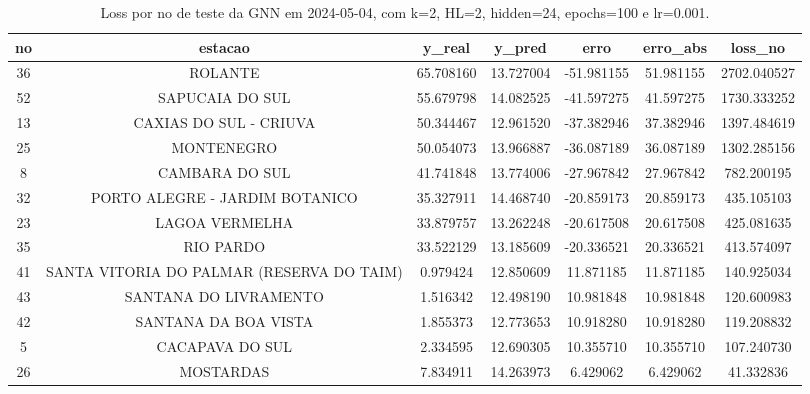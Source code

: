 \begin{table}[h]
\centering
\caption{Loss por no de teste da GNN em 2024-05-04, com k=2, HL=2, hidden=24, epochs=100 e lr=0.001.}
\label{tab:gnn_loss_k2_hl2_h24_e100_d20240504}
\begin{tabular}{ccccccc}
\toprule
no & estacao & y\_real & y\_pred & erro & erro\_abs & loss\_no \\
\midrule
36 & ROLANTE & 65.708160 & 13.727004 & -51.981155 & 51.981155 & 2702.040527 \\
52 & SAPUCAIA DO SUL & 55.679798 & 14.082525 & -41.597275 & 41.597275 & 1730.333252 \\
13 & CAXIAS DO SUL - CRIUVA & 50.344467 & 12.961520 & -37.382946 & 37.382946 & 1397.484619 \\
25 & MONTENEGRO & 50.054073 & 13.966887 & -36.087189 & 36.087189 & 1302.285156 \\
8 & CAMBARA DO SUL & 41.741848 & 13.774006 & -27.967842 & 27.967842 & 782.200195 \\
32 & PORTO ALEGRE - JARDIM BOTANICO & 35.327911 & 14.468740 & -20.859173 & 20.859173 & 435.105103 \\
23 & LAGOA VERMELHA & 33.879757 & 13.262248 & -20.617508 & 20.617508 & 425.081635 \\
35 & RIO PARDO & 33.522129 & 13.185609 & -20.336521 & 20.336521 & 413.574097 \\
41 & SANTA VITORIA DO PALMAR (RESERVA DO TAIM) & 0.979424 & 12.850609 & 11.871185 & 11.871185 & 140.925034 \\
43 & SANTANA DO LIVRAMENTO & 1.516342 & 12.498190 & 10.981848 & 10.981848 & 120.600983 \\
42 & SANTANA DA BOA VISTA & 1.855373 & 12.773653 & 10.918280 & 10.918280 & 119.208832 \\
5 & CACAPAVA DO SUL & 2.334595 & 12.690305 & 10.355710 & 10.355710 & 107.240730 \\
26 & MOSTARDAS & 7.834911 & 14.263973 & 6.429062 & 6.429062 & 41.332836 \\
\bottomrule
\end{tabular}
\end{table}
